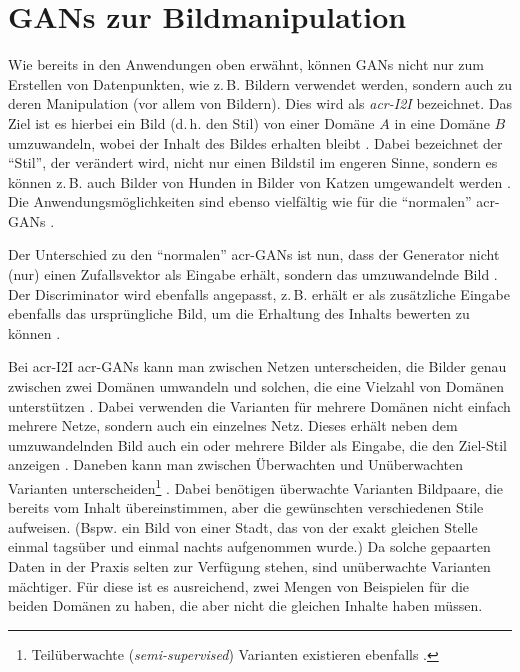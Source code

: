 \section{GANs zur Bildmanipulation}

Wie bereits in den Anwendungen oben erwähnt, können GANs nicht nur zum Erstellen
von Datenpunkten, wie z.\,B. Bildern verwendet werden, sondern auch zu deren
Manipulation (vor allem von Bildern). Dies wird als \emph{\gls{acr-I2I}}
bezeichnet. Das Ziel ist es hierbei ein Bild (d.\,h. den Stil) von einer Domäne
$A$ in eine Domäne $B$ umzuwandeln, wobei der Inhalt des Bildes erhalten bleibt
\cite[S. 1]{pang2021image}. Dabei bezeichnet der \enquote{Stil}, der verändert wird,
nicht nur einen Bildstil im engeren Sinne, sondern es können z.\,B. auch Bilder
von Hunden in Bilder von Katzen umgewandelt werden \cite{liu2019few}.
Die Anwendungsmöglichkeiten sind ebenso vielfältig wie für die \enquote{normalen}
\gls{acr-GAN}s \cite[vgl.][S. 1]{pang2021image}.

Der Unterschied zu den \enquote{normalen} \gls{acr-GAN}s ist nun, dass der Generator
nicht (nur) einen Zufallsvektor als Eingabe erhält, sondern das umzuwandelnde
Bild \cite[S. 1]{pang2021image}. Der Discriminator wird ebenfalls angepasst, z.\,B. erhält er als
zusätzliche Eingabe ebenfalls das ursprüngliche Bild, um die Erhaltung des
Inhalts bewerten zu können \cite{isola2017image}.

Bei \gls{acr-I2I} \gls{acr-GAN}s kann man zwischen Netzen unterscheiden, die
Bilder genau zwischen zwei Domänen umwandeln \cite{isola2017image,
zhu2017unpaired, ledig2017photo, demir2018patch} und solchen, die eine Vielzahl von
Domänen unterstützen
\cite{liu2019few,huang2017arbitrary,saito2020coco,anokhin2020high}. Dabei
verwenden die Varianten für mehrere Domänen nicht einfach mehrere Netze, sondern
auch ein einzelnes
Netz. Dieses erhält neben dem umzuwandelnden Bild auch ein oder mehrere Bilder
als Eingabe, die den Ziel-Stil anzeigen \cites[S.
11]{pang2021image}{liu2019few}.
Daneben kann man zwischen Überwachten \cite{isola2017image,ledig2017photo,demir2018patch} und Unüberwachten
\cite{liu2019few,zhu2017unpaired,huang2017arbitrary,saito2020coco,anokhin2020high,}
Varianten unterscheiden\footnote{Teilüberwachte (\emph{semi-supervised})
Varianten existieren ebenfalls \cite[S. 5]{pang2021image}.}  \cite[vgl.][S. 5,
11]{pang2021image}.
Dabei benötigen
überwachte Varianten Bildpaare, die bereits vom Inhalt übereinstimmen, aber die
gewünschten verschiedenen Stile aufweisen. (Bspw. ein Bild von einer Stadt, das
von der exakt gleichen Stelle einmal tagsüber und einmal nachts aufgenommen
wurde.) Da solche gepaarten Daten in der Praxis selten zur Verfügung stehen,
sind unüberwachte Varianten mächtiger. Für diese ist es ausreichend, zwei Mengen
von Beispielen für die beiden Domänen zu haben, die aber nicht die gleichen
Inhalte haben müssen.